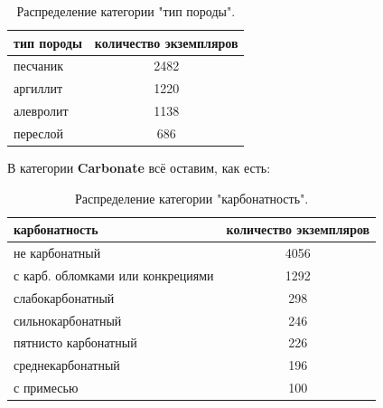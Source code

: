 \documentclass[14pt]{matmex-diploma}
\begin{document}
        \begin{table}[h!]
            \centering
            \begin{tabular}{|l|c|}
                \hline
                \textbf{тип породы} & \textbf{количество экземпляров} \\
                \hline
                песчаник            & 2482                            \\
                \hline
                аргиллит            & 1220                            \\
                \hline
                алевролит           & 1138                            \\
                \hline
                переслой            & 686                            \\
                \hline
            \end{tabular}
            \caption{Распределение категории "тип породы".}
            \label{table_rock}  
        \end{table}  
        
        В категории \textbf{Carbonate} всё оставим, как есть:
        
        \begin{table}[h!]
            \centering
            \begin{tabular}{|l|c|}
                \hline
                \textbf{карбонатность}            & \textbf{количество экземпляров} \\
                \hline
                не карбонатный                    &       4056 \\
                \hline
                с карб. обломками или конкрециями &       1292 \\
                \hline
                слабокарбонатный                  &        298 \\
                \hline
                сильнокарбонатный                 &        246 \\
                \hline
                пятнисто карбонатный              &        226 \\
                \hline
                среднекарбонатный                 &        196 \\
                \hline
                с примесью                        &        100 \\
                \hline
            \end{tabular}    
            \caption{Распределение категории "карбонатность".}
            \label{table_carbonate}  
        \end{table}      
        
\end{document}

